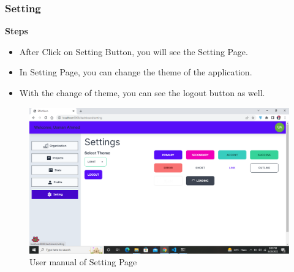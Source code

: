 \subsubsection{Setting}
\textbf{Steps}
\begin{itemize}
    \item After Click on Setting Button, you will see the Setting Page.
    \item In Setting Page, you can change the theme of the application.
    \item With the change of theme, you can see the logout button as well.
\end{itemize}

\begin{figure}[H]
    \centering
    \includegraphics[scale=0.4]{./diagrams/user-manual/Screenshot (29).png}
    \caption{User manual of Setting Page}
    \label{fig:user-1}

\end{figure}
